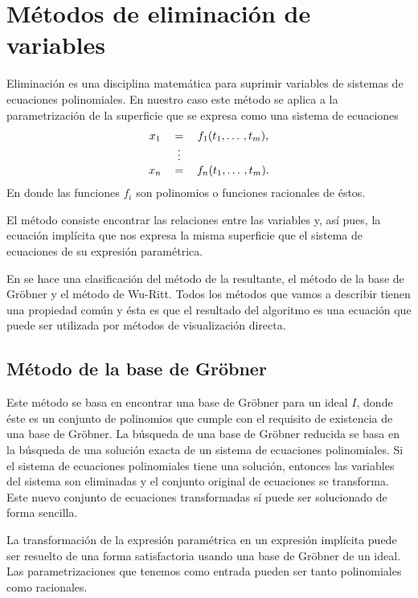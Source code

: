 \section{Métodos de eliminación de variables}

Eliminación es una disciplina matemática para suprimir variables de sistemas de ecuaciones polinomiales. En nuestro caso este método se aplica a la parametrización de la superficie que se expresa como una sistema de ecuaciones
\begin{equation}
    \begin{tabular}{c c c}
        $x_1$ & = & $f_1(t_1, \dotso, t_m)$, \\
         & $\vdots$ & \\
        $x_n$ & = & $f_n(t_1, \dotso, t_m).$
    \end{tabular}
    \nonumber
\end{equation}
En donde las funciones $f_i$ son polinomios o funciones racionales de éstos.

El método consiste encontrar las relaciones entre las variables y, así pues, la ecuación implícita que nos expresa la misma superficie que el sistema de ecuaciones de su expresión paramétrica.

En \cite{Hoffmann93} se hace una clasificación del método de la resultante, el método de la base de Gröbner y el método de Wu-Ritt. Todos los métodos que vamos a describir tienen una propiedad común y ésta es que el resultado del algoritmo es una ecuación que puede ser utilizada por métodos de visualización directa.

\subsection{Método de la base de Gröbner}

Este método se basa en encontrar una base de Gröbner para un ideal $I$, donde éste es un conjunto de polinomios que cumple con el requisito de existencia de una base de Gröbner. La búsqueda  de una base de Gröbner reducida se basa en la búsqueda de una solución exacta de un sistema de ecuaciones polinomiales. Si el sistema de ecuaciones polinomiales tiene una solución, entonces las variables del sistema son eliminadas y el conjunto original de ecuaciones se transforma. Este nuevo conjunto de ecuaciones transformadas sí puede ser solucionado de forma sencilla.

La transformación de la expresión paramétrica en un expresión implícita puede ser resuelto de una forma satisfactoria usando una base de Gröbner de un ideal. Las parametrizaciones que tenemos como entrada pueden ser tanto polinomiales como racionales.

